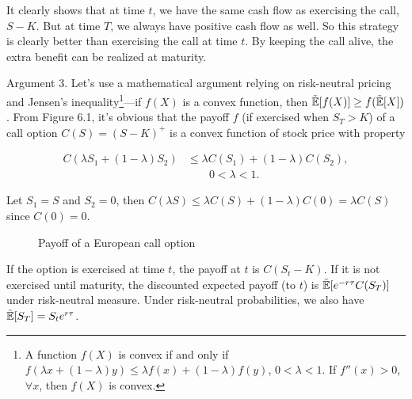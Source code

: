 \begin{solution}
It clearly shows that at time $t$, we have the same cash flow as exercising the call,
$S-K$. But at time $T$, we always have positive cash flow as well. So this strategy is clearly
better than exercising the call at time $t$. By keeping the call alive, the extra benefit can be
realized at maturity.

Argument 3. Let's use a mathematical argument relying on risk-neutral pricing and
Jensen's inequality\footnote[5]{A function $f(X)$ is convex if and only if
$f(\lambda x+(1-\lambda)y)\leq\lambda f(x)+(1-\lambda)f(y)$, $0<\lambda<1$. If
$f''(x)>0$, $\forall x$, then $f(X)$ is convex.}---if $f(X)$ is a convex function, then
$\tilde{\mathbb{E}}[f(X)]\geq f(\tilde{\mathbb{E}}[X])$. From Figure 6.1, it's obvious that the payoff $f$ (if
exercised when $S_T>K$) of a call option $C(S)=(S-K)^+$ is a convex function of stock
price with property

\[
\begin{aligned}
C(\lambda S_1+(1-\lambda)S_2)&\leq\lambda C(S_1)+(1-\lambda)C(S_2),\\
&\qquad 0<\lambda<1.
\end{aligned}
\]

Let $S_1=S$ and $S_2=0$, then $C(\lambda S)\leq\lambda C(S)+(1-\lambda)C(0)=\lambda C(S)$ since
$C(0)=0$.

\begin{figure}[ht]
\centering
{}
\caption{Payoff of a European call option}
\label{fig:zhou-figure-6-1}
\end{figure}

If the option is exercised at time $t$, the payoff at $t$ is $C(S_t-K)$. If it is not exercised
until maturity, the discounted expected payoff (to $t$) is $\tilde{\mathbb{E}}[e^{-r\tau}C(S_T)]$ under
risk-neutral measure. Under risk-neutral probabilities, we also have $\tilde{\mathbb{E}}[S_T]=S_te^{r\tau}$.


\end{solution}
